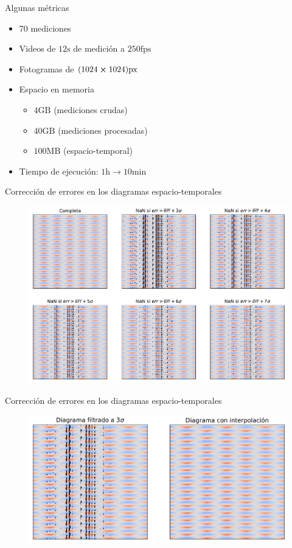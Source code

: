 \documentclass[aspectratio=169]{beamer}
\begin{document}
\begin{frame}{Algunas métricas} %
	\begin{itemize}
		\item 70 mediciones
		\item Videos de $12\text{s}$ de medición a $250\text{fps}$ 
		\item Fotogramas de $(1024\cross1024)\text{px}$
		\item Espacio en memoria 
			\begin{itemize}
				\item $4\text{GB}$ (mediciones crudas)
				\item $40\text{GB}$ (mediciones procesadas)
				\item $100\text{MB}$ (espacio-temporal)
			\end{itemize}
		\item Tiempo de ejecución: $1\text{h} \rightarrow 10\text{min}$
	\end{itemize}
\end{frame}


\begin{frame}{Corrección de errores en los diagramas espacio-temporales}
	\begin{figure}[ht]
		\includegraphics[width=0.75\linewidth]{figs/error_analysis.pdf}
	\end{figure}
\end{frame}

\begin{frame}{Corrección de errores en los diagramas espacio-temporales}
	\begin{figure}[ht]
		\includegraphics[width=0.8\linewidth]{figs/error_interp.pdf}
	\end{figure}
\end{frame}
\end{document}
